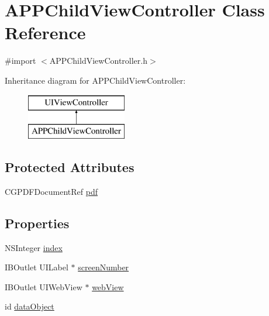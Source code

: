 \hypertarget{interface_a_p_p_child_view_controller}{\section{A\+P\+P\+Child\+View\+Controller Class Reference}
\label{interface_a_p_p_child_view_controller}
}


{\ttfamily \#import $<$A\+P\+P\+Child\+View\+Controller.\+h$>$}

Inheritance diagram for A\+P\+P\+Child\+View\+Controller\+:\begin{figure}[H]
\begin{center}
\leavevmode
\includegraphics[height=2.000000cm]{d0/db2/interface_a_p_p_child_view_controller}
\end{center}
\end{figure}
\subsection*{Protected Attributes}
\begin{DoxyCompactItemize}
\item 
C\+G\+P\+D\+F\+Document\+Ref \hyperlink{interface_a_p_p_child_view_controller_a49090a70e7ab1989a9675acbd042eb9e}{pdf}
\end{DoxyCompactItemize}
\subsection*{Properties}
\begin{DoxyCompactItemize}
\item 
N\+S\+Integer \hyperlink{interface_a_p_p_child_view_controller_accecfd9572f912f5ca9e35236521d49a}{index}
\item 
I\+B\+Outlet U\+I\+Label $\ast$ \hyperlink{interface_a_p_p_child_view_controller_acb441c535672227c1f1f0ab06d2ab9fe}{screen\+Number}
\item 
I\+B\+Outlet U\+I\+Web\+View $\ast$ \hyperlink{interface_a_p_p_child_view_controller_a1f5838da40857d637ed5a6cf412910f8}{web\+View}
\item 
id \hyperlink{interface_a_p_p_child_view_controller_a45d2bf0ae541d2145028922b6076cdf5}{data\+Object}
\end{DoxyCompactItemize}



